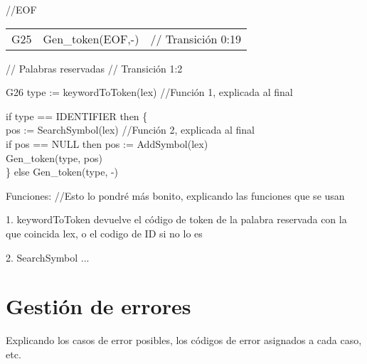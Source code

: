\documentclass{article}
\begin{document}
{    \vspace{0.2cm}
    
    //EOF 
    
    \vspace{0.1cm}
    
    \begin{tabular}{p{1cm} p{5cm} p{3cm}}
        G25 & Gen\_token(EOF,-) & // Transición 0:19 \\
    \end{tabular}
    
    \vspace{0.2cm}
    
    // Palabras reservadas	\hspace{3.5cm}	// Transición 1:2 
    
    \vspace{0.1cm}
    
    G26 type := keywordToToken(lex) \hspace{1cm} //Función 1, explicada al final
    
    if type == IDENTIFIER then \{ \\
    
    \hspace{0.5cm} pos := SearchSymbol(lex) \hspace{1cm} //Función 2, explicada al final \\
    
    \hspace{0.5cm} if pos == NULL then pos := AddSymbol(lex) \\
    
    \hspace{0.5cm} Gen\_token(type, pos) \\
    
    \} else Gen\_token(type, -)
    
}

\vspace{0.5cm}

Funciones: //Esto lo pondré más bonito, explicando las funciones que se usan

1. keywordToToken devuelve el código de token de la palabra reservada con la que coincida lex, o el codigo de ID si no lo es 

2. SearchSymbol ... 









\section{Gestión de errores}
Explicando los casos de error posibles, los códigos de error asignados a cada caso, etc.
\end{document}
